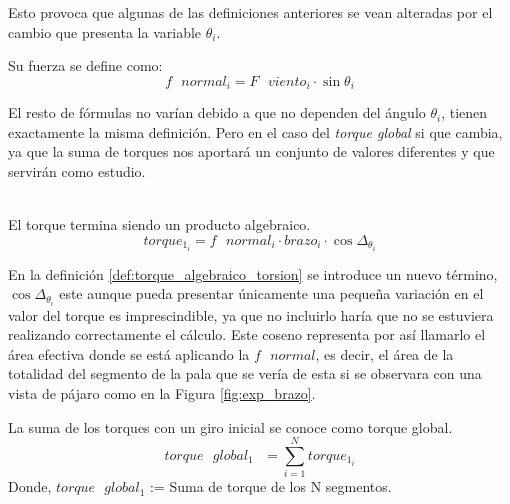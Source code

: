 Esto provoca que algunas de las definiciones anteriores se vean alteradas por el cambio que presenta la variable $\theta_i$.\\

 

 \begin{definicion}
  Su fuerza se define como:
  $$ f \text{ } normal_i = F \text{ } viento_i \cdot \sin{\theta_i}$$
  \label{def:fuerza_normal_torsion}
 \end{definicion}

El resto de fórmulas no varían debido a que no dependen del ángulo $\theta_i$, tienen exactamente la misma definición. Pero en el caso del \textit{torque global} si que cambia, ya que la suma de torques nos aportará un conjunto de valores diferentes y que servirán como estudio. \\\\

  \begin{definicion}
  El torque termina siendo un producto algebraico.
 $$ torque_1_{i} = f \text{ } normal_i \cdot brazo_i \cdot \cos{\Delta_{\theta_{i}}}$$
 \label{def:torque_algebraico_torsion}
 \end{definicion}
 
 En la definición \ref{def:torque_algebraico_torsion} se introduce un nuevo término, $ \cos{\Delta_{\theta_{i}}} $ este aunque pueda presentar únicamente una pequeña variación en el valor del torque es imprescindible, ya que no incluirlo haría que no se estuviera realizando correctamente el cálculo. Este coseno representa por así llamarlo el área efectiva donde se está aplicando la $ f \text{ } normal $, es decir, el área de la totalidad del segmento de la pala que se vería de esta si se observara con una vista de pájaro como en la Figura \ref{fig:exp_brazo}. \\

\begin{definicion}
 La suma de los torques con un giro inicial se conoce como torque global.
 $$ torque \text{ } global_1 \text{ } = \sum_{i=1}^{N} torque_1_{i} $$
Donde,
\centering $torque \text{ } global_1$ := Suma de torque de los N segmentos.
 \label{def:torque_global_1}
\end{definicion}






















